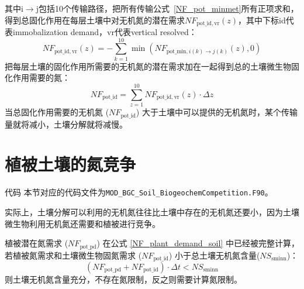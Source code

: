 其中$\mathrm {i \rightarrow j}$包括10个传输路径，把所有传输公式~\eqref{NF_pot_minmet}所有正项求和，得到总固化作用在每层土壤中对无机氮的潜在需求$NF_{\mathrm{pot\_id,vr}}(z)$，其中下标id代表immobalization demand，vr代表vertical resolved：
\begin{equation}\label{NF_immob_demand_vr}
  NF_{\mathrm{pot\_id,vr}}(z)=-\sum_{k=1}^{10}\min{\left(NF_{\mathrm{pot\_min},i(k)\rightarrow j(k)}\left(z\right), 0\right)}
\end{equation}
把每层土壤的固化作用所需要的无机氮的潜在需求加在一起得到总的土壤微生物固化作用需要的氮：
\begin{equation}
    NF_{\mathrm{pot\_id}}=\sum_{z=1}^{10}{NF_{\mathrm{pot\_id,vr}}(z) \cdot \Delta z}
\end{equation}
当总固化作用需要的无机氮 ($NF_{\mathrm{pot\_id}}$) 大于土壤中可以提供的无机氮时，某个传输量就将减小，土壤分解就将减慢。


\section{植被土壤的氮竞争}\label{植被土壤的氮竞争}
\begin{mymdframed}{代码}
  本节对应的代码文件为\texttt{MOD\_BGC\_Soil\_BiogeochemCompetition.F90}。
\end{mymdframed}
实际上，土壤分解可以利用的无机氮往往比土壤中存在的无机氮还要小，因为土壤微生物利用无机氮还需要和植被进行竞争。

植被潜在氮需求 ($NF_{\mathrm{pot\_{pd}}}$) 在公式 \eqref{NF_plant_demand_soil} 中已经被完整计算，若植被氮需求和土壤微生物固氮需求 ($NF_{\mathrm{pot\_{id}}}$) 小于总土壤无机氮含量(${NS}_{\mathrm{sminn}}$)：
\begin{equation}
  \left(NF_{\mathrm{pot\_{pd}}}+NF_{\mathrm{pot\_id}}\right)\cdot\Delta t<NS_{\mathrm{sminn}}
\end{equation}
则土壤无机氮含量充分，不存在氮限制，反之则需要计算氮限制。

